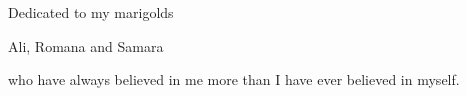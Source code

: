 
Dedicated to my marigolds

Ali, Romana and Samara

who have always believed in me more than I have ever believed in myself.